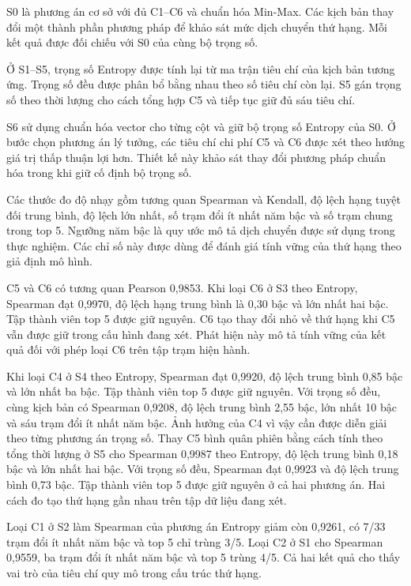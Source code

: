\documentclass[conference,a4paper]{IEEEtran}
\begin{document}
S0 là phương án cơ sở với đủ C1–C6 và chuẩn hóa Min-Max. Các kịch bản thay đổi một thành phần phương pháp để khảo sát mức dịch chuyển thứ hạng. Mỗi kết quả được đối chiếu với S0 của cùng bộ trọng số.

Ở S1–S5, trọng số Entropy được tính lại từ ma trận tiêu chí của kịch bản tương ứng. Trọng số đều được phân bổ bằng nhau theo số tiêu chí còn lại. S5 gán trọng số theo thời lượng cho cách tổng hợp C5 và tiếp tục giữ đủ sáu tiêu chí.

S6 sử dụng chuẩn hóa vector cho từng cột và giữ bộ trọng số Entropy của S0. Ở bước chọn phương án lý tưởng, các tiêu chí chi phí C5 và C6 được xét theo hướng giá trị thấp thuận lợi hơn. Thiết kế này khảo sát thay đổi phương pháp chuẩn hóa trong khi giữ cố định bộ trọng số.

Các thước đo độ nhạy gồm tương quan Spearman và Kendall, độ lệch hạng tuyệt đối trung bình, độ lệch lớn nhất, số trạm đổi ít nhất năm bậc và số trạm chung trong top 5. Ngưỡng năm bậc là quy ước mô tả dịch chuyển được sử dụng trong thực nghiệm. Các chỉ số này được dùng để đánh giá tính vững của thứ hạng theo giả định mô hình.

C5 và C6 có tương quan Pearson 0,9853. Khi loại C6 ở S3 theo Entropy, Spearman đạt 0,9970, độ lệch hạng trung bình là 0,30 bậc và lớn nhất hai bậc. Tập thành viên top 5 được giữ nguyên. C6 tạo thay đổi nhỏ về thứ hạng khi C5 vẫn được giữ trong cấu hình đang xét. Phát hiện này mô tả tính vững của kết quả đối với phép loại C6 trên tập trạm hiện hành.

Khi loại C4 ở S4 theo Entropy, Spearman đạt 0,9920, độ lệch trung bình 0,85 bậc và lớn nhất ba bậc. Tập thành viên top 5 được giữ nguyên. Với trọng số đều, cùng kịch bản có Spearman 0,9208, độ lệch trung bình 2,55 bậc, lớn nhất 10 bậc và sáu trạm đổi ít nhất năm bậc. Ảnh hưởng của C4 vì vậy cần được diễn giải theo từng phương án trọng số. Thay C5 bình quân phiên bằng cách tính theo tổng thời lượng ở S5 cho Spearman 0,9987 theo Entropy, độ lệch trung bình 0,18 bậc và lớn nhất hai bậc. Với trọng số đều, Spearman đạt 0,9923 và độ lệch trung bình 0,73 bậc. Tập thành viên top 5 được giữ nguyên ở cả hai phương án. Hai cách đo tạo thứ hạng gần nhau trên tập dữ liệu đang xét.

Loại C1 ở S2 làm Spearman của phương án Entropy giảm còn 0,9261, có 7/33 trạm đổi ít nhất năm bậc và top 5 chỉ trùng 3/5. Loại C2 ở S1 cho Spearman 0,9559, ba trạm đổi ít nhất năm bậc và top 5 trùng 4/5. Cả hai kết quả cho thấy vai trò của tiêu chí quy mô trong cấu trúc thứ hạng.
\end{document}
